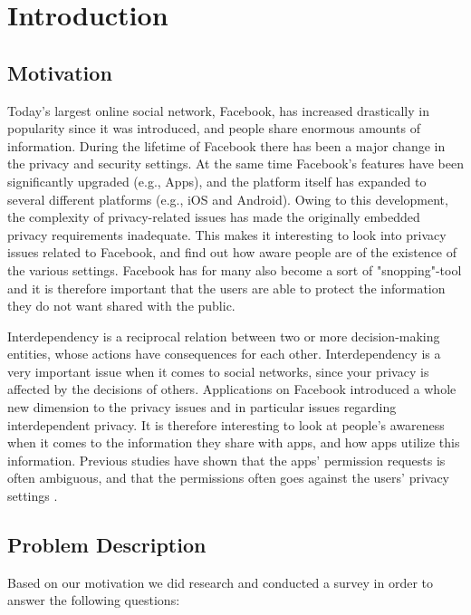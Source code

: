 \chapter{Introduction}
\label{chp:introduction} 

\section{Motivation}
Today's largest online social network, Facebook, has increased drastically in popularity since it was introduced, and people share enormous amounts of information. During the lifetime of Facebook there has been a major change in the privacy and security settings. At the same time Facebook's features have been significantly upgraded (e.g., Apps), and the platform itself has expanded to several different platforms (e.g., iOS and Android). Owing to this development, the complexity of privacy-related issues has made the originally embedded privacy requirements inadequate. This makes it interesting to look into privacy issues related to Facebook, and find out how aware people are of the existence of the various settings. Facebook has for many also become a sort of "snopping"-tool and it is therefore important that the users are able to protect the information they do not want shared with the public.

Interdependency is a reciprocal relation between two or more decision-making entities, whose actions have consequences for each other. Interdependency is a very important issue when it comes to social networks, since your privacy is affected by the decisions of others. Applications on Facebook introduced a whole new dimension to the privacy issues and in particular issues regarding interdependent privacy. It is therefore interesting to look at people's awareness when it comes to the information they share with apps, and how apps utilize this information. Previous studies have shown that the apps' permission requests is often ambiguous, and that the permissions often goes against the users' privacy settings \cite{thirdPartyApps}.  


\section{Problem Description}
Based on our motivation we did research and conducted a survey in order to answer the following questions: 

